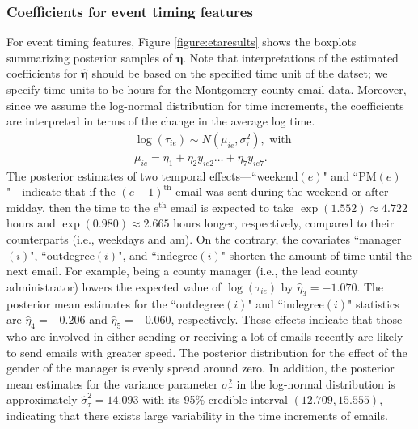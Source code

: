 \documentclass[ba]{imsart}
\numberwithin{equation}{section}
\theoremstyle{plain}
\begin{document}
	\subsubsection{Coefficients for event timing features}
	For event timing features, Figure \ref{figure:etaresults} shows the boxplots summarizing posterior samples of $\boldsymbol{\eta}$. Note that interpretations of the estimated coefficients for $\hat{\boldsymbol{\eta}}$ should be based on the specified time unit of the datset; we specify time units to be hours for the Montgomery county email data. Moreover, since we assume the log-normal distribution for time increments, the coefficients are interpreted in terms of the change in the average log time.
	\begin{equation*}
		\begin{aligned}
			&\log(\tau_{ie}) \sim N(\mu_{ie}, \sigma_\tau^2), \mbox{ with }\\
			&\mu_{ie} = \eta_{1}+\eta_{2} y_{ie2}\ldots+\eta_{7}y_{ie7}.
		\end{aligned}
	\end{equation*}
	The posterior estimates of two temporal effects---``weekend$(e)$" and ``PM$(e)$"---indicate that if the $(e-1)^{\textrm{th}}$ email was sent during the weekend or after midday, then the time to the $e^{\textrm{th}}$ email is expected to take $\exp(1.552)\approx 4.722$ hours and $\exp(0.980)\approx2.665$ hours longer, respectively, compared to their counterparts (i.e., weekdays and am). On the contrary, the covariates ``manager$(i)$", ``outdegree$(i)$", and ``indegree$(i)$"  shorten the amount of time until the next email. For example, being a county manager (i.e., the lead county administrator) lowers the expected value of $\log(\tau_{ie})$ by $\hat{\eta}_3 = -1.070$. The posterior mean estimates for the  ``outdegree$(i)$" and ``indegree$(i)$" statistics are $\hat{\eta}_4=-0.206$ and $\hat{\eta}_5=-0.060$, respectively. These effects indicate that those who are involved in either sending or receiving a lot of emails recently are likely to send emails with greater speed. The posterior distribution for the effect of the gender of the manager is evenly spread around zero. In addition, the posterior mean estimates for the variance parameter $\sigma^2_\tau$ in the log-normal distribution is approximately $\hat{\sigma}^2_\tau=14.093$ with its 95\% credible interval $(12.709, 15.555)$, indicating that there exists large variability in the time increments of emails.
\end{document}

